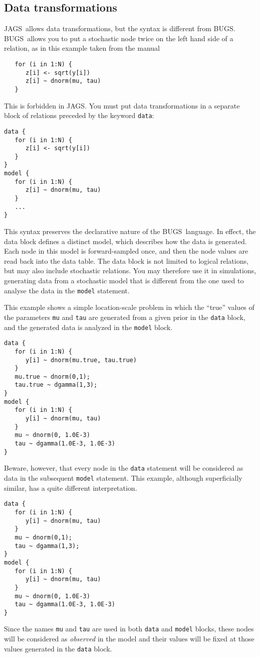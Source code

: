 \documentclass[11pt, a4paper, titlepage]{report}
\newcommand{\JAGS}{\textsf{JAGS}}
\newcommand{\BUGS}{\textsf{BUGS}}
\begin{document}
\subsection{Data transformations}
\label{section:data:tranformations}

\JAGS\ allows data transformations, but the syntax is different from
\BUGS.  \BUGS\ allows you to put a stochastic node twice on the left
hand side of a relation, as in this example taken from the manual
\begin{verbatim}
   for (i in 1:N) {
      z[i] <- sqrt(y[i])
      z[i] ~ dnorm(mu, tau)
   }
\end{verbatim}
This is forbidden in \JAGS. You must put data transformations in a 
separate block of relations preceded by the keyword \texttt{data}:
\begin{verbatim}
data {
   for (i in 1:N) {
      z[i] <- sqrt(y[i])
   }
}
model {
   for (i in 1:N) {
      z[i] ~ dnorm(mu, tau)
   }
   ...
}
\end{verbatim}
This syntax preserves the declarative nature of the \BUGS\ language.
In effect, the data block defines a distinct model, which describes
how the data is generated. Each node in this model is forward-sampled
once, and then the node values are read back into the data table. The
data block is not limited to logical relations, but may also include
stochastic relations. You may therefore use it in simulations,
generating data from a stochastic model that is different from the one
used to analyse the data in the \texttt{model} statement.

This example shows a simple location-scale problem in which the ``true''
values of the parameters \texttt{mu} and \texttt{tau} are generated
from a given prior in the \texttt{data} block, and the generated
data is analyzed in the \texttt{model} block.
\begin{verbatim}
data {
   for (i in 1:N) {
      y[i] ~ dnorm(mu.true, tau.true) 
   }
   mu.true ~ dnorm(0,1);
   tau.true ~ dgamma(1,3);
}
model {
   for (i in 1:N) {
      y[i] ~ dnorm(mu, tau)
   }
   mu ~ dnorm(0, 1.0E-3)
   tau ~ dgamma(1.0E-3, 1.0E-3)
}
\end{verbatim}
Beware, however, that every node in the \texttt{data} statement will
be considered as data in the subsequent \texttt{model} statement. This
example, although superficially similar, has a quite different interpretation.
\begin{verbatim}
data {
   for (i in 1:N) {
      y[i] ~ dnorm(mu, tau) 
   }
   mu ~ dnorm(0,1);
   tau ~ dgamma(1,3);
}
model {
   for (i in 1:N) {
      y[i] ~ dnorm(mu, tau)
   }
   mu ~ dnorm(0, 1.0E-3)
   tau ~ dgamma(1.0E-3, 1.0E-3)
}
\end{verbatim}
Since the names \texttt{mu} and \texttt{tau} are used in both
\texttt{data} and \texttt{model} blocks, these nodes will be
considered as {\em observed} in the model and their values will be
fixed at those values generated in the \texttt{data} block.
\end{document}
